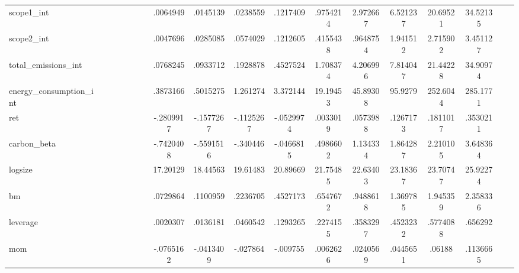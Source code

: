 {\begin{tabular}{l*{1}{ccccccccccccccccc}}
scope1\_int  &            &            &            &            &            &            &    .0064949&    .0145139&    .0238559&    .1217409&    .9754214&    2.972667&    6.521237&    20.69521&    34.52135&            &            \\
scope2\_int  &            &            &            &            &            &            &    .0047696&    .0285085&    .0574029&    .1212605&    .4155438&    .9648754&    1.941512&    2.715902&    3.451127&            &            \\
total\_emissions\_int&            &            &            &            &            &            &    .0768245&    .0933712&    .1928878&    .4527524&    1.708374&    4.206996&    7.814047&    21.44228&    34.90974&            &            \\
energy\_consumption\_int&            &            &            &            &            &            &    .3873166&    .5015275&    1.261274&    3.372144&    19.19453&    45.89308&     95.9279&    252.6044&    285.1771&            &            \\
ret         &            &            &            &            &            &            &   -.2809917&   -.1577267&   -.1125267&   -.0529974&    .0033019&    .0573988&    .1267173&    .1811017&    .3530211&            &            \\
carbon\_beta &            &            &            &            &            &            &   -.7420408&   -.5591516&    -.340446&   -.0466815&    .4986602&    1.134334&    1.864287&    2.210105&    3.648364&            &            \\
logsize     &            &            &            &            &            &            &    17.20129&    18.44563&    19.61483&    20.89669&    21.75485&    22.63403&    23.18367&    23.70747&    25.92274&            &            \\
bm          &            &            &            &            &            &            &    .0729864&    .1100959&    .2236705&    .4527173&    .6547672&    .9488618&    1.369785&    1.945359&    2.358336&            &            \\
leverage    &            &            &            &            &            &            &    .0020307&    .0136181&    .0460542&    .1293265&    .2274155&    .3583297&    .4523232&    .5774088&     .656292&            &            \\
mom         &            &            &            &            &            &            &   -.0765162&   -.0413409&    -.027864&    -.009755&    .0062626&    .0240569&    .0445651&      .06188&    .1136665&            &            \\

\end{tabular}}
